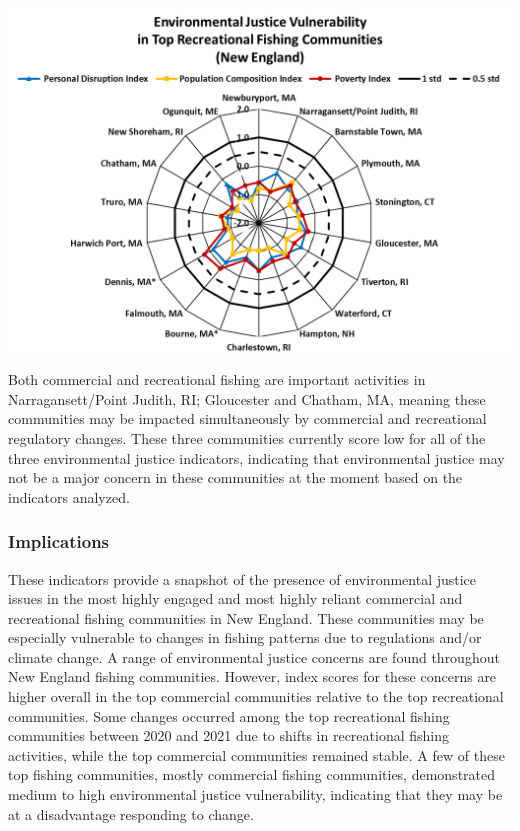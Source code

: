 \documentclass[
  10pt,
]{article}
\let\origfigure\figure
\let\endorigfigure\endfigure
\renewenvironment{figure}[1][2] {
    \expandafter\origfigure\expandafter[H]
} {
    \endorigfigure
}
\begin{document}
\begin{figure}

{\centering \includegraphics[width=0.75\linewidth]{SOE-NEFMC_files/figure-latex/recreational-EJ-1} 

}

\caption{Environmental justice indicators (Poverty Index, population composition index, and personal disruption index) for top recreational fishing communities in New England. *Community scored high (1.00 and above) for both commercial engagement and reliance indicators.}\label{fig:recreational-EJ}
\end{figure}

Both commercial and recreational fishing are important activities in Narragansett/Point Judith, RI; Gloucester and Chatham, MA, meaning these communities may be impacted simultaneously by commercial and recreational regulatory changes. These three communities currently score low for all of the three environmental justice indicators, indicating that environmental justice may not be a major concern in these communities at the moment based on the indicators analyzed.

\hypertarget{implications-4}{%
\subsubsection{Implications}\label{implications-4}}

These indicators provide a snapshot of the presence of environmental justice issues in the most highly engaged and most highly reliant commercial and recreational fishing communities in New England. These communities may be especially vulnerable to changes in fishing patterns due to regulations and/or climate change. A range of environmental justice concerns are found throughout New England fishing communities. However, index scores for these concerns are higher overall in the top commercial communities relative to the top recreational communities. Some changes occurred among the top recreational fishing communities between 2020 and 2021 due to shifts in recreational fishing activities, while the top commercial communities remained stable. A few of these top fishing communities, mostly commercial fishing communities, demonstrated medium to high environmental justice vulnerability, indicating that they may be at a disadvantage responding to change.
\end{document}

